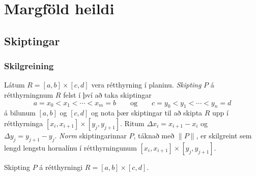 
\theoremstyle{definition}
\newtheorem{exercise}[theorem]{}





\newbox\mytempbox
\newdimen\mytempdimen

\newcommand\includegraphicscopyright[3][]{%
  \leavevmode\vbox{\vskip3pt\raggedright\setbox\mytempbox=\hbox{\texttt{[image: \#2]}}%
    \mytempdimen=\wd\mytempbox\box\mytempbox\par\vskip1pt%
    \fontsize{3}{3.5}\selectfont{\color{black!25}{\vbox{\hsize=\mytempdimen#3}}}\vskip3pt%
}}

\newenvironment{colortabular}[1]{\medskip\rowcolors[]{1}{blue!20}{blue!10}\tabular{#1}\rowcolor{blue!40}}{\endtabular\medskip}

\def\equad{\leavevmode\hbox{}\quad}

\newenvironment{greencolortabular}[1]
{\medskip\rowcolors[]{1}{green!50!black!20}{green!50!black!10}%
  \tabular{#1}\rowcolor{green!50!black!40}}%
{\endtabular\medskip}




\section{Margföld heildi}


\subsection{Skiptingar} 

\subsubsection{Skilgreining }
Látum $R=[a,b]\times[c,d]$ vera
rétthyrning í planinu.  {\em Skipting} $P$ á rétthyrningnum $R$ felst í
því að taka skiptingar
$$a=x_0<x_1<\cdots<x_m=b\qquad\mbox{og}\qquad
c=y_0<y_1<\cdots<y_n=d$$
 á bilunum $[a,b]$ og $[c,d]$ og nota þær skiptingar til að skipta $R$
 upp í rétthyrninga $[x_i,x_{i+1}]\times [y_j,y_{j+1}]$.  
Ritum $\Delta x_i=x_{i+1}-x_i$ og  $\Delta y_j=y_{j+1}-y_j$.
{\em Norm} skiptingarinnar $P$, táknað með $\|P\|$,  
er skilgreint sem lengd lengstu hornalínu í
   rétthyrningunum $[x_i,x_{i+1}]\times [y_j,y_{j+1}]$.



Skipting $P$ á rétthyrningi $R= [a,b]\times [c,d]$.

